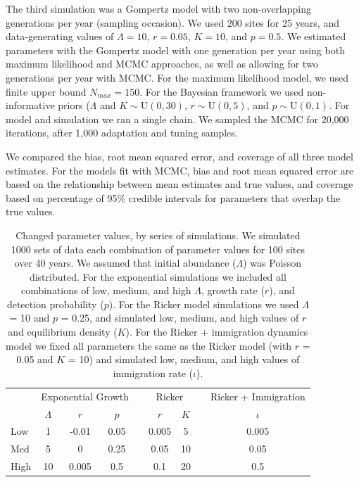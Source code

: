 \documentclass{article}
\begin{document}
The third simulation was a Gompertz model with two non-overlapping generations per year (sampling occasion).   
We used 200 sites for 25 years, and data-generating values of $\Lambda = 10$, $r = 0.05$, $K = 10$, and $p = 0.5$.
We estimated parameters with the Gompertz model with 
one generation per year using both maximum likelihood and MCMC approaches, as well
as allowing for two generations per year with MCMC.  
For the maximum likelihood model, we used finite upper bound $N_{max} = 150$. 
For the Bayesian framework we used non-informative priors ($\Lambda$ and $K  \sim \mathrm{U}(0, 30)$, $r  \sim \mathrm{U}(0, 5)$,
and $p  \sim \mathrm{U}(0, 1)$.  
For model and simulation we ran a single chain. We sampled the MCMC for 20,000 iterations, after 1,000 adaptation and tuning samples.  

We compared the bias, root mean
squared error, and coverage of all three model estimates.  For the models fit with MCMC,
bias and root mean squared error are based on the relationship between mean estimates
and true values, and coverage
based on percentage of 95\% credible intervals for parameters that overlap the true values.
\newpage


\begin{table}[t]
  \centering
\caption{Changed parameter values, by series of simulations.  We
simulated 1000 sets of data each combination of parameter values
for 100 sites over 40 years.  We assumed that initial abundance
($\Lambda$) was Poisson distributed.  For the exponential 
simulations we included all combinations of low, medium, and
high $\Lambda$, growth rate ($r$), and detection probability ($p$).
For the Ricker model simulations we used $\Lambda$ = 10 and $p$ = 0.25, and
simulated low, medium, and high values of $r$ and equilibrium density ($K$).
For the Ricker + immigration dynamics model we fixed all parameters the
same as the Ricker model (with $r$ = 0.05 and $K$ = 10) and
simulated low, medium, and high values of immigration rate ($\iota$).}  
\begin{tabular}{lcccccccc}
    \hline
    & \multicolumn{3}{c}{Exponential Growth} && \multicolumn{2}{c}{Ricker} &&
    Ricker + Immigration \\
    \cline{2-4}     \cline{6-7}    \cline{9-9}
& $\Lambda$ & $r$ & $p$ && $r$  & $K$ && $\iota$  \\    
\hline
    Low	        &1	&-0.01	&0.05	&&0.005	 &5	&&0.005  \\
    Med	        &5	&0	&0.25	&&0.05	&10	&&0.05   \\
    High		 &10 &0.005	&0.5	&&0.1	&20	&&0.5    \\
    \hline
  \end{tabular}
\end{table}
\end{document}
